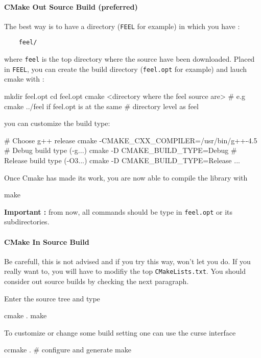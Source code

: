 \paragraph{CMake Out Source Build (preferred)}
The best way is to have a directory (\lstinline|FEEL| for example) in which you have : \\
\begin{lstlisting}
	feel/
\end{lstlisting}
where \lstinline|feel| is the top directory where the source have been downloaded. Placed in \lstinline|FEEL|, you can create the build directory (\lstinline|feel.opt| for example) and lauch cmake with :
\begin{unixcom}
  mkdir feel.opt
  cd feel.opt
  cmake <directory where the feel source are>
  # e.g cmake ../feel if feel.opt is at the same
  # directory level as feel
\end{unixcom}
you can customize the build type:
\begin{unixcom}
  # Choose g++ release
  cmake -CMAKE_CXX_COMPILER=/usr/bin/g++-4.5
  # Debug build type (-g...)
  cmake -D CMAKE_BUILD_TYPE=Debug
  # Release build type (-O3...)
  cmake -D CMAKE_BUILD_TYPE=Release
  ...
\end{unixcom}
Once Cmake has made its work, you are now able to compile the library with
\begin{unixcom}
		make
\end{unixcom}
\textbf{Important :} from now, all commands should be type in \lstinline|feel.opt| or its subdirectories.
\paragraph{CMake In Source Build}

Be carefull, this is not advised and if you try this way, \cmake won't let you do. If you really want to, you will have to modifiy the top \lstinline|CMakeLists.txt|. You should consider out source builds by checking the next paragraph.

Enter the source tree and type
\begin{unixcom}
  cmake .
  make
\end{unixcom}

To customize or change some build setting one can use the \cmake curse interface
\ccmake
\begin{unixcom}
  ccmake . # configure and generate
  make
\end{unixcom}




